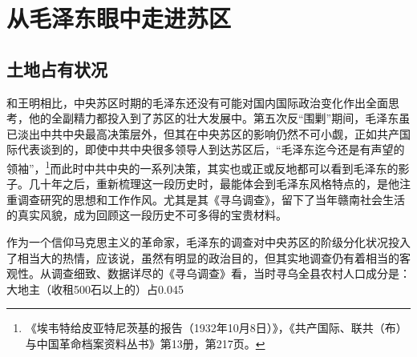 \section{从毛泽东眼中走进苏区}

\subsection{土地占有状况}


和王明相比，中央苏区时期的毛泽东还没有可能对国内国际政治变化作出全面思考，他的全副精力都投入到了苏区的壮大发展中。第五次反“围剿”期间，毛泽东虽已淡出中共中央最高决策层外，但其在中央苏区的影响仍然不可小觑，正如共产国际代表谈到的，即使中共中央很多领导人到达苏区后，“毛泽东迄今还是有声望的领袖”，\footnote{《埃韦特给皮亚特尼茨基的报告（1932年10月8日）》，《共产国际、联共（布）与中国革命档案资料丛书》第13册，第217页。}而此时中共中央的一系列决策，其实也或正或反地都可以看到毛泽东的影子。几十年之后，重新梳理这一段历史时，最能体会到毛泽东风格特点的，是他注重调查研究的思想和工作作风。尤其是其《寻乌调查》，留下了当年赣南社会生活的真实风貌，成为回顾这一段历史不可多得的宝贵材料。


作为一个信仰马克思主义的革命家，毛泽东的调查对中央苏区的阶级分化状况投入了相当大的热情，应该说，虽然有明显的政治目的，但其实地调查仍有着相当的客观性。从调查细致、数据详尽的《寻乌调查》看，当时寻乌全县农村人口成分是：大地主（收租500石以上的）占0.045%



